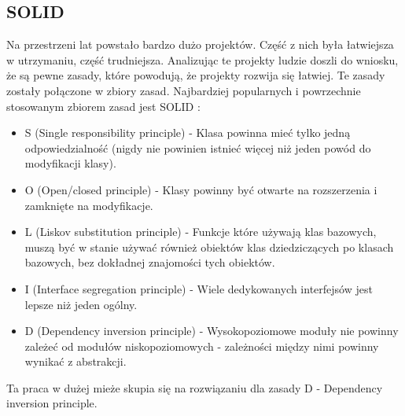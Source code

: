 \documentclass[12pt]{article}
\begin{document}
\subsection{SOLID}
Na przestrzeni lat powstało bardzo dużo projektów. Część z nich była łatwiejsza w utrzymaniu, część trudniejsza. Analizując te projekty ludzie doszli do wniosku, że są pewne zasady, które powodują, że projekty rozwija się łatwiej. Te zasady zostały połączone w zbiory zasad. Najbardziej popularnych i powrzechnie stosowanym zbiorem zasad jest SOLID \cite{SOLID}:
\begin{itemize}
	\item S (Single responsibility principle) - Klasa powinna mieć tylko jedną odpowiedzialność (nigdy nie powinien istnieć więcej niż jeden powód do modyfikacji klasy).
	\item O (Open/closed principle) - Klasy powinny być otwarte na rozszerzenia i zamknięte na modyfikacje.
	\item L (Liskov substitution principle) - Funkcje które używają klas bazowych, muszą być w stanie używać również obiektów klas dziedziczących po klasach bazowych, bez dokładnej znajomości tych obiektów.
	\item I (Interface segregation principle) - Wiele dedykowanych interfejsów jest lepsze niż jeden ogólny.
	\item D (Dependency inversion principle) - Wysokopoziomowe moduły nie powinny zależeć od modułów niskopoziomowych - zależności między nimi powinny wynikać z abstrakcji.
\end{itemize}
Ta praca w dużej mieże skupia się na rozwiązaniu dla zasady D - Dependency inversion principle. 
\end{document}
